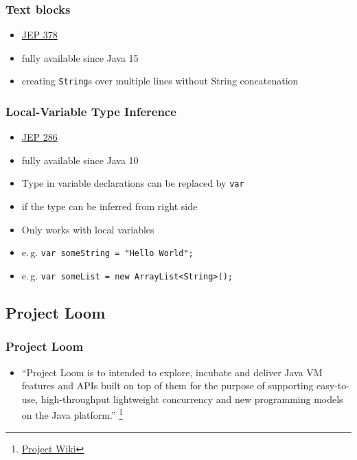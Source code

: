 \documentclass{beamer}
\begin{document}
\begin{frame}
\frametitle{Text blocks}
\begin{itemize}
  \item \href{https://openjdk.org/jeps/378}{JEP 378}
  \item fully available since Java 15
  \pause
  \item creating \texttt{String}s over multiple lines without String concatenation
\end{itemize}
\pause

\end{frame}

\begin{frame}
\frametitle{Local-Variable Type Inference}
\begin{itemize}
  \item \href{https://openjdk.org/jeps/286}{JEP 286}
  \item fully available since Java 10
  \pause
  \item Type in variable declarations can be replaced by \texttt{var}
  \item if the type can be inferred from right side
  \item Only works with local variables
  \pause
  \item e.\,g. \texttt{var someString = "Hello World";}
  \item e.\,g. \texttt{var someList = new ArrayList<String>();}
\end{itemize}
\end{frame}

\subsection{Project Loom}
\begin{frame}
\frametitle{Project Loom}
\begin{itemize}
  \item ``Project Loom is to intended to explore, incubate and deliver Java VM features and APIs built on top of them for the purpose of supporting easy-to-use, high-throughput lightweight concurrency and new programming models on the Java platform.''
  \footnote{\href{https://wiki.openjdk.org/display/loom/Main}{Project Wiki}}
\end{itemize}
\end{frame}
\end{document}
